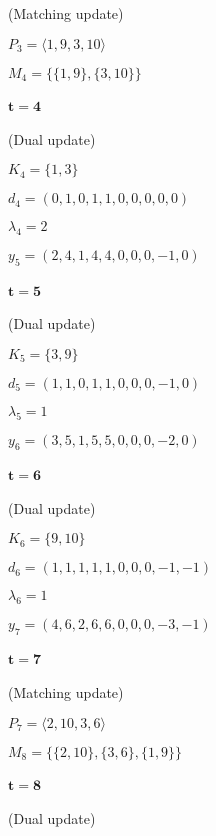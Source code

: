 \documentclass[a4paper,10pt, leqno]{article}
\theoremstyle{definition}
\begin{document}
(Matching update)

$P_3 = \langle 1, 9, 3, 10 \rangle$ 

$M_4 = \{\{ 1, 9 \}, \{3, 10\}\}$ 

\paragraph{$\mathbf{t = 4}$}

(Dual update)

$K_4 = \{ 1, 3 \}$

$d_4 = (0, 1, 0, 1, 1, 0, 0, 0, 0, 0)$

$\lambda_4 = 2$

$y_5 = (2, 4, 1, 4, 4, 0, 0, 0, -1, 0)$

\paragraph{$\mathbf{t = 5}$}

(Dual update)

$K_5 = \{ 3, 9 \}$

$d_5 = (1, 1, 0, 1, 1, 0, 0, 0, -1, 0)$

$\lambda_5 = 1$

$y_6 = (3, 5, 1, 5, 5, 0, 0, 0, -2, 0)$

\paragraph{$\mathbf{t = 6}$}

(Dual update)

$K_6 = \{ 9, 10 \}$

$d_6 = (1, 1, 1, 1, 1, 0, 0, 0, -1, -1)$

$\lambda_6 = 1$

$y_7 = (4, 6, 2, 6, 6, 0, 0, 0, -3, -1)$

\paragraph{$\mathbf{t = 7}$}

(Matching update)

$P_7 = \langle 2, 10, 3, 6 \rangle$ 

$M_8 = \{\{ 2, 10 \}, \{3, 6\}, \{ 1, 9 \}\}$ 

\paragraph{$\mathbf{t = 8}$}

(Dual update)
\end{document}

